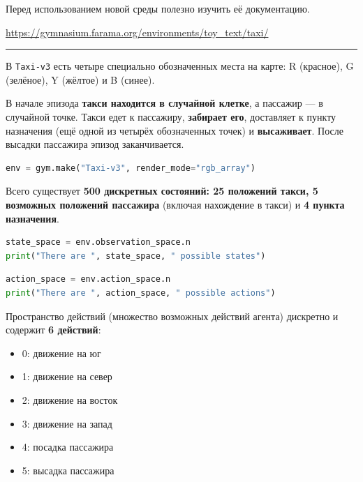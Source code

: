 \documentclass[11pt,a4paper]{article}
\begin{document}
Перед использованием новой среды полезно изучить её документацию.

\url{https://gymnasium.farama.org/environments/toy_text/taxi/}

\begin{center}\rule{0.5\linewidth}{0.5pt}\end{center}

В \passthrough{\lstinline!Taxi-v3!} есть четыре специально обозначенных места на карте: R (красное), G (зелёное), Y (жёлтое) и B (синее).

В начале эпизода \textbf{такси находится в случайной клетке}, а пассажир --- в случайной точке. Такси едет к пассажиру, \textbf{забирает его}, доставляет к пункту назначения (ещё одной из четырёх обозначенных точек) и \textbf{высаживает}. После высадки пассажира эпизод заканчивается.


\begin{lstlisting}[language=Python]
env = gym.make("Taxi-v3", render_mode="rgb_array")
\end{lstlisting}

Всего существует \textbf{500 дискретных состояний: 25 положений такси, 5 возможных положений пассажира} (включая нахождение в такси) и \textbf{4 пункта назначения}.

\begin{lstlisting}[language=Python]
state_space = env.observation_space.n
print("There are ", state_space, " possible states")
\end{lstlisting}

\begin{lstlisting}[language=Python]
action_space = env.action_space.n
print("There are ", action_space, " possible actions")
\end{lstlisting}

Пространство действий (множество возможных действий агента) дискретно и содержит \textbf{6 действий}:

\begin{itemize}
\tightlist
\item
  0: движение на юг
\item
  1: движение на север
\item
  2: движение на восток
\item
  3: движение на запад
\item
  4: посадка пассажира
\item
  5: высадка пассажира
\end{itemize}
\end{document}
